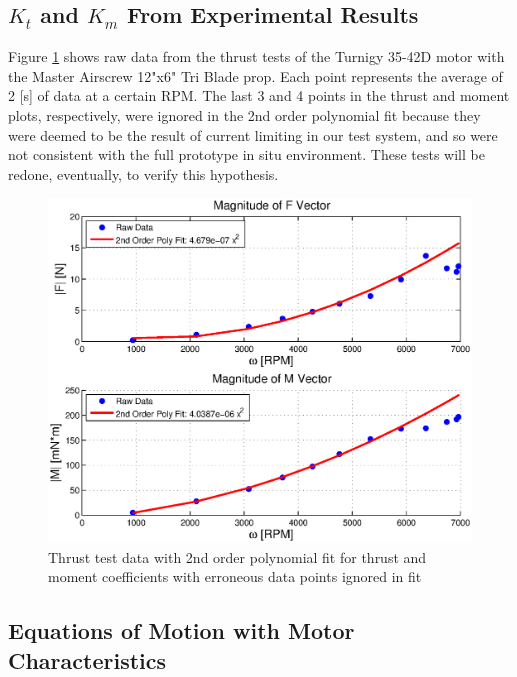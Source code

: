 \documentclass{article}
\numberwithin{equation}{section}
\begin{document}
\subsection{$K_t$ and $K_m$ From Experimental Results}
Figure \ref{thrustAndMomCoeffs} shows raw data from the thrust tests of the Turnigy 35-42D motor with the Master Airscrew 12"x6" Tri Blade prop.  Each point represents the average of 2 [s] of data at a certain RPM.  The last 3 and 4 points in the thrust and moment plots, respectively, were ignored in the 2nd order polynomial fit because they were deemed to be the result of current limiting in our test system, and so were not consistent with the full prototype in situ environment.  These tests will be redone, eventually, to verify this hypothesis. 
\begin{figure}[h]
  \includegraphics[width=5in]{images/forceAndMomMagFitOmega.eps}
  \caption{Thrust test data with 2nd order polynomial fit for thrust and moment coefficients with erroneous data points ignored in fit}
   \label{thrustAndMomCoeffs}
\end{figure}

\subsection{Equations of Motion with Motor Characteristics}
\end{document}
